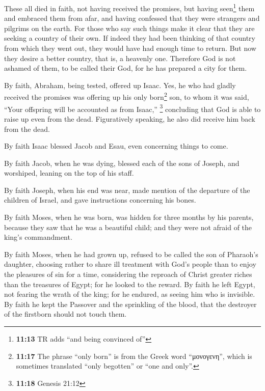  These all died in faith, not having received the
promises, but having seen\footnote{\textbf{11:13} TR adds ``and being
  convinced of''} them and embraced them from afar, and having confessed
that they were strangers and pilgrims on the earth.  For
those who say such things make it clear that they are seeking a country
of their own.  If indeed they had been thinking of that
country from which they went out, they would have had enough time to
return.  But now they desire a better country, that is, a
heavenly one. Therefore God is not ashamed of them, to be called their
God, for he has prepared a city for them.

 By faith, Abraham, being tested, offered up Isaac. Yes,
he who had gladly received the promises was offering up his only
born\footnote{\textbf{11:17} The phrase ``only born'' is from the Greek
  word ``μονογενη'', which is sometimes translated ``only begotten'' or
  ``one and only''.} son,  to whom it was said, ``Your
offspring will be accounted as from Isaac,'' \footnote{\textbf{11:18}
  Genesis 21:12}  concluding that God is able to raise up
even from the dead. Figuratively speaking, he also did receive him back
from the dead.

 By faith Isaac blessed Jacob and Esau, even concerning
things to come.

 By faith Jacob, when he was dying, blessed each of the
sons of Joseph, and worshiped, leaning on the top of his staff.

 By faith Joseph, when his end was near, made mention of
the departure of the children of Israel, and gave instructions
concerning his bones.

 By faith Moses, when he was born, was hidden for three
months by his parents, because they saw that he was a beautiful child;
and they were not afraid of the king's commandment.

 By faith Moses, when he had grown up, refused to be
called the son of Pharaoh's daughter,  choosing rather to
share ill treatment with God's people than to enjoy the pleasures of sin
for a time,  considering the reproach of Christ greater
riches than the treasures of Egypt; for he looked to the reward.
 By faith he left Egypt, not fearing the wrath of the
king; for he endured, as seeing him who is invisible.  By
faith he kept the Passover and the sprinkling of the blood, that the
destroyer of the firstborn should not touch them.


